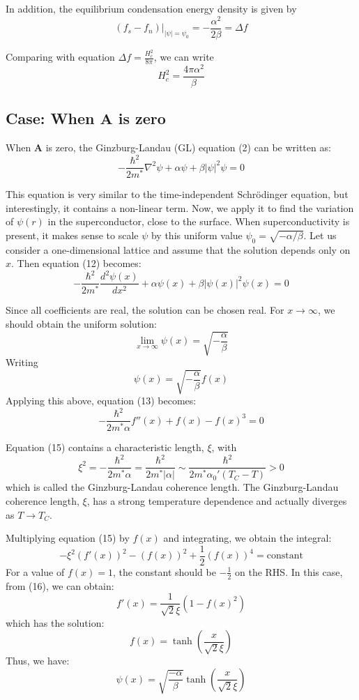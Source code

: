 \documentclass{article}
\begin{document}
In addition, the equilibrium condensation energy density is given by
\[
(f_s - f_n)\bigg|_{|\psi| = \psi_0} = - \frac{\alpha^2}{2\beta} = \Delta f \tag{40}
\]

Comparing with equation $\Delta f = \frac{H_c^2}{8\pi}$, we can write
\[
H_c^2 = \frac{4 \pi \alpha^2}{\beta} \tag{41}
\]

\subsection{Case: When $\mathbf{A}$ is zero}

When $\mathbf{A}$ is zero, the Ginzburg-Landau (GL) equation (2) can be written as:
\[
-\frac{\hbar^2}{2m^*} \nabla^2 \psi + \alpha \psi + \beta |\psi|^2 \psi = 0 \tag{12}
\]

This equation is very similar to the time-independent Schrödinger equation, but interestingly, it contains a non-linear term. Now, we apply it to find the variation of $\psi(r)$ in the superconductor, close to the surface. When superconductivity is present, it makes sense to scale $\psi$ by this uniform value $\psi_0 = \sqrt{-\alpha/\beta}$. Let us consider a one-dimensional lattice and assume that the solution depends only on $x$. Then equation (12) becomes:
\[
-\frac{\hbar^2}{2m^*} \frac{d^2 \psi(x)}{dx^2} + \alpha \psi(x) + \beta |\psi(x)|^2 \psi(x) = 0 \tag{13}
\]

Since all coefficients are real, the solution can be chosen real. For $x \to \infty$, we should obtain the uniform solution:
\[
\lim_{x \to \infty} \psi(x) = \sqrt{-\frac{\alpha}{\beta}}
\]
Writing
\[
\psi(x) = \sqrt{-\frac{\alpha}{\beta}} f(x) \tag{14}
\]
Applying this above, equation (13) becomes:
\[
-\frac{\hbar^2}{2m^* \alpha} f''(x) + f(x) - f(x)^3 = 0 \tag{15}
\]

Equation (15) contains a characteristic length, $\xi$, with
\[
\xi^2 = -\frac{\hbar^2}{2m^*\alpha} = \frac{\hbar^2}{2m^* |\alpha|} \sim \frac{\hbar^2}{2m^* \alpha_0' (T_C - T)} > 0
\]
which is called the Ginzburg-Landau coherence length. The Ginzburg-Landau coherence length, $\xi$, has a strong temperature dependence and actually diverges as $T \to T_C$.

Multiplying equation (15) by $f(x)$ and integrating, we obtain the integral:
\[
-\xi^2 \left(f'(x)\right)^2 - \left(f(x)\right)^2 + \frac{1}{2} \left(f(x)\right)^4 = \text{constant} \tag{16}
\]
For a value of $f(x) = 1$, the constant should be $-\frac{1}{2}$ on the RHS. In this case, from (16), we can obtain:
\[
f'(x) = \frac{1}{\sqrt{2}\xi} \left(1 - f(x)^2\right)
\]
which has the solution:
\[
f(x) = \tanh\left(\frac{x}{\sqrt{2}\xi}\right) \tag{17}
\]
Thus, we have:
\[
\psi(x) = \sqrt{\frac{-\alpha}{\beta}} \tanh\left(\frac{x}{\sqrt{2}\xi}\right)
\]
\end{document}
